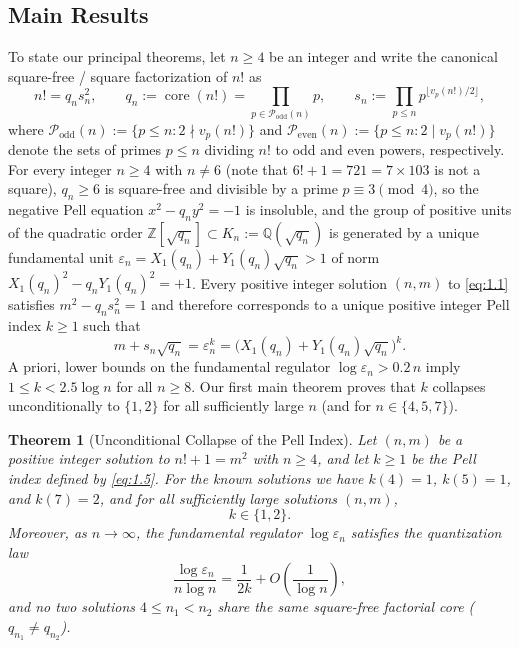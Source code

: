 \documentclass[11pt,reqno]{amsart}
\newtheorem{theorem}{Theorem}[section]
\theoremstyle{remark}
\numberwithin{equation}{section}
\newcommand{\Z}{\mathbb{Z}}
\newcommand{\Q}{\mathbb{Q}}
\newcommand{\Podd}{\mathcal{P}_{\mathrm{odd}}}
\newcommand{\Peven}{\mathcal{P}_{\mathrm{even}}}
\DeclareMathOperator{\core}{core}
\begin{document}
\subsection{Main Results}
To state our principal theorems, let $n \ge 4$ be an integer and write the canonical square-free / square factorization of $n!$ as
\begin{equation}\label{eq:1.4}
n! = q_n s_n^2, \qquad q_n := \core(n!) = \prod_{p \in \Podd(n)} p, \qquad s_n := \prod_{p \le n} p^{\lfloor v_p(n!)/2 \rfloor},
\end{equation}
where $\Podd(n) := \{p \le n : 2 \nmid v_p(n!)\}$ and $\Peven(n) := \{p \le n : 2 \mid v_p(n!)\}$ denote the sets of primes $p \le n$ dividing $n!$ to odd and even powers, respectively. For every integer $n \ge 4$ with $n \ne 6$ (note that $6! + 1 = 721 = 7 \times 103$ is not a square), $q_n \ge 6$ is square-free and divisible by a prime $p \equiv 3 \pmod 4$, so the negative Pell equation $x^2 - q_n y^2 = -1$ is insoluble, and the group of positive units of the quadratic order $\Z[\sqrt{q_n}] \subset K_n := \Q(\sqrt{q_n})$ is generated by a unique fundamental unit $\varepsilon_n = X_1(q_n) + Y_1(q_n)\sqrt{q_n} > 1$ of norm $X_1(q_n)^2 - q_n Y_1(q_n)^2 = +1$. Every positive integer solution $(n, m)$ to \eqref{eq:1.1} satisfies $m^2 - q_n s_n^2 = 1$ and therefore corresponds to a unique positive integer Pell index $k \ge 1$ such that
\begin{equation}\label{eq:1.5}
m + s_n\sqrt{q_n} = \varepsilon_n^k = \bigl(X_1(q_n) + Y_1(q_n)\sqrt{q_n}\bigr)^k.
\end{equation}
A priori, lower bounds on the fundamental regulator $\log \varepsilon_n > 0.2\,n$ imply $1 \le k < 2.5\log n$ for all $n \ge 8$. Our first main theorem proves that $k$ collapses unconditionally to $\{1, 2\}$ for all sufficiently large $n$ (and for $n \in \{4, 5, 7\}$).

\begin{theorem}[{Unconditional Collapse of the Pell Index}]\label{thm:1.1}
Let $(n, m)$ be a positive integer solution to $n! + 1 = m^2$ with $n \ge 4$, and let $k \ge 1$ be the Pell index defined by \eqref{eq:1.5}. For the known solutions we have $k(4) = 1$, $k(5) = 1$, and $k(7) = 2$, and for all sufficiently large solutions $(n, m)$,
\begin{equation}\label{eq:1.6}
k \in \{1, 2\}.
\end{equation}
Moreover, as $n \to \infty$, the fundamental regulator $\log \varepsilon_n$ satisfies the quantization law
\begin{equation}\label{eq:1.7}
\frac{\log \varepsilon_n}{n\log n} = \frac{1}{2k} + O\!\left(\frac{1}{\log n}\right),
\end{equation}
and no two solutions $4 \le n_1 < n_2$ share the same square-free factorial core ($q_{n_1} \ne q_{n_2}$).
\end{theorem}
\end{document}
